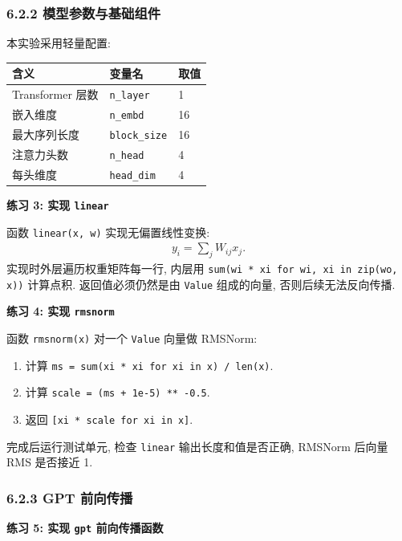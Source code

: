 \documentclass{../../nndlcourse}
\begin{document}
\subsubsection*{6.2.2 模型参数与基础组件}

本实验采用轻量配置:
\begin{center}
\begin{tabular}{|l|l|l|}
\hline
\textbf{含义} & \textbf{变量名} & \textbf{取值} \\
\hline
Transformer 层数 & \texttt{n\_layer} & 1 \\
\hline
嵌入维度 & \texttt{n\_embd} & 16 \\
\hline
最大序列长度 & \texttt{block\_size} & 16 \\
\hline
注意力头数 & \texttt{n\_head} & 4 \\
\hline
每头维度 & \texttt{head\_dim} & 4 \\
\hline
\end{tabular}
\end{center}

\textbf{练习 3: 实现 \texttt{linear}}

函数 \texttt{linear(x, w)} 实现无偏置线性变换:
\begin{align}
    y_i = \sum_j W_{ij}x_j.
\end{align}
实现时外层遍历权重矩阵每一行, 内层用 \texttt{sum(wi * xi for wi, xi in zip(wo, x))} 计算点积. 返回值必须仍然是由 \texttt{Value} 组成的向量, 否则后续无法反向传播.

\textbf{练习 4: 实现 \texttt{rmsnorm}}

函数 \texttt{rmsnorm(x)} 对一个 \texttt{Value} 向量做 RMSNorm:
\begin{enumerate}
    \item 计算 \texttt{ms = sum(xi * xi for xi in x) / len(x)}.
    \item 计算 \texttt{scale = (ms + 1e-5) ** -0.5}.
    \item 返回 \texttt{[xi * scale for xi in x]}.
\end{enumerate}
完成后运行测试单元, 检查 \texttt{linear} 输出长度和值是否正确, RMSNorm 后向量 RMS 是否接近 1.

\subsubsection*{6.2.3 GPT 前向传播}

\textbf{练习 5: 实现 \texttt{gpt} 前向传播函数}
\end{document}
